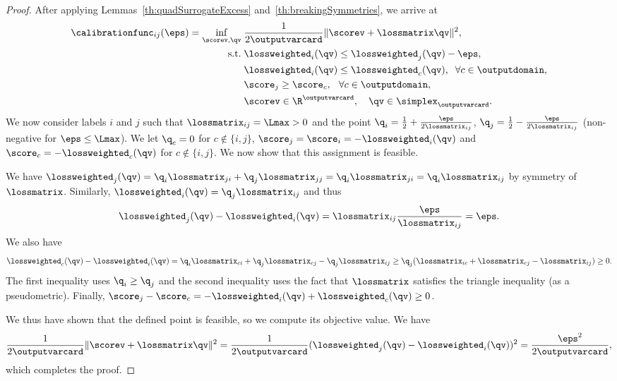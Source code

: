 \documentclass{article}
\begin{document}
\begin{proof}
    After applying Lemmas~\ref{th:quadSurrogateExcess} and~\ref{th:breakingSymmetries}, we arrive at
    \begin{align}
    \label{eq:upperBoundcalibrationFunction:breakingSymmetries}
    \calibrationfunc_{ij}(\eps)
    =
    \inf_{\scorev, \qv} \;& \frac{1}{2\outputvarcard} \| \scorev + \lossmatrix\qv \|^2, \\
    \notag %
    \text{s.t.} \;& \lossweighted_i(\qv) \leq\lossweighted_j(\qv) - \eps,\\
    \notag %
    &\lossweighted_i(\qv) \leq \lossweighted_c(\qv),\;\; \forall c \in \outputdomain, \\
    \notag %
    &\score_j \geq \score_c,\;\:\: \forall c \in \outputdomain, \\
    \notag %
    & \scorev \in \R^\outputvarcard, \quad \qv \in \simplex_\outputvarcard.
    \end{align}
    We now consider labels $i$ and $j$ such that $\lossmatrix_{ij}=\Lmax > 0$ and the point $\q_i = \frac12 + \frac{\eps}{2\lossmatrix_{ij}}$, $\q_j = \frac12 - \frac{\eps}{2\lossmatrix_{ij}}$ (non-negative for $\eps \leq \Lmax$). We let $\q_c = 0$ for $c \not\in \{i,j\}$, $\score_j = \score_i = -\lossweighted_i(\qv)$ and $\score_c = -\lossweighted_c(\qv)$ for $c \not\in \{i,j\}$. We now show that this assignment is feasible. 
    
    We have $\lossweighted_j(\qv) = \q_i \lossmatrix_{ji} + \q_j \lossmatrix_{jj}=\q_i \lossmatrix_{ji} = \q_i \lossmatrix_{ij}$ by symmetry of $\lossmatrix$. Similarly, $\lossweighted_i(\qv) = \q_j \lossmatrix_{ij}$ and thus
    \[
    \lossweighted_j(\qv) - \lossweighted_i(\qv) = \lossmatrix_{ij} \frac{\eps}{\lossmatrix_{ij}} = \eps.
    \]
    We also have 
    \begin{equation*}
    \lossweighted_c(\qv) - \lossweighted_i(\qv) = \q_i \lossmatrix_{ci} + \q_j \lossmatrix_{cj} - \q_j \lossmatrix_{ij} \geq  \q_j (\lossmatrix_{ic} + \lossmatrix_{cj} - \lossmatrix_{ij}) \geq 0.
    \end{equation*}
    The first inequality uses  $\q_i \geq \q_j$ and the second inequality uses the fact that $\lossmatrix$ satisfies the triangle inequality (as a pseudometric).
    Finally, $\score_j - \score_c = - \lossweighted_i(\qv) + \lossweighted_c(\qv) \geq 0$.
    
    We thus have shown that the defined point is feasible, so we compute its objective value.
    We have
    \[
    \frac{1}{2\outputvarcard} \| \scorev + \lossmatrix\qv \|^2 = \frac{1}{2\outputvarcard}(\lossweighted_j(\qv) - \lossweighted_i(\qv))^2 = \frac{\eps^2}{2\outputvarcard},
    \]
    which completes the proof.
\end{proof}
\end{document}
